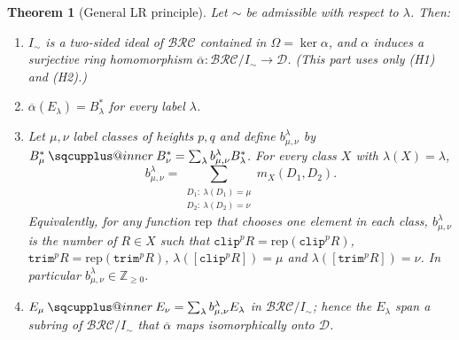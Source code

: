 \documentclass{amsart}
\makeatletter
\newcommand{\sqcupplus@inner}[2]{%
  \vcenter{\hbox{\ooalign{%
    \hfil$\m@th#1\sqcup$\hfil\cr
    \hfil\raisebox{0.15ex}{$\m@th#1\scriptscriptstyle+$}\hfil\cr
  }}}%
}
\newcommand{\sqcupplus}{\mathbin{\mathpalette\sqcupplus@inner\relax}}
\newtheorem{theorem}{Theorem}[section]
\theoremstyle{definition}
\theoremstyle{remark}
\numberwithin{equation}{subsection}
\newcommand{\trm}{\mathtt{trim}}
\newcommand{\clp}{\mathtt{clip}}
\newcommand{\BRC}{\mathcal{BRC}}
\newcommand{\dcoma}{\mathcal{D}}
\makeatother
\begin{document}
\begin{theorem}[General LR principle]\label{theorem:general_lr_template}
Let $\sim$ be admissible with respect to $\lambda$. Then:
\begin{enumerate}
\item $I_\sim$ is a two-sided ideal of $\BRC$ contained in $\Omega=\ker\alpha$, and $\alpha$ induces a surjective ring homomorphism $\overline\alpha:\BRC/I_\sim\to\dcoma$. (This part uses only (H1) and (H2).)
\item $\overline\alpha(E_\lambda)=B_\lambda^*$ for every label $\lambda$.
\item Let $\mu,\nu$ label classes of heights $p,q$ and define $b_{\mu,\nu}^\lambda$ by $B_\mu^*\sqcupplus B_\nu^*=\sum_\lambda b_{\mu,\nu}^\lambda B_\lambda^*$. For every class $X$ with $\lambda(X)=\lambda$,
$$b_{\mu,\nu}^\lambda=\sum_{\substack{D_1:\ \lambda(D_1)=\mu\\ D_2:\ \lambda(D_2)=\nu}}m_X(D_1,D_2)\text{.}$$
Equivalently, for any function $\mathrm{rep}$ that chooses one element in each class, $b_{\mu,\nu}^\lambda$ is the number of $R\in X$ such that $\clp^pR=\mathrm{rep}(\clp^pR)$, $\trm^pR=\mathrm{rep}(\trm^pR)$, $\lambda([\clp^pR])=\mu$ and $\lambda([\trm^pR])=\nu$. In particular $b_{\mu,\nu}^\lambda\in\mathbb Z_{\geq0}$.
\item $E_\mu\sqcupplus E_\nu=\sum_\lambda b_{\mu,\nu}^\lambda E_\lambda$ in $\BRC/I_\sim$; hence the $E_\lambda$ span a subring of $\BRC/I_\sim$ that $\overline\alpha$ maps isomorphically onto $\dcoma$.
\end{enumerate}
\end{theorem}
\end{document}
